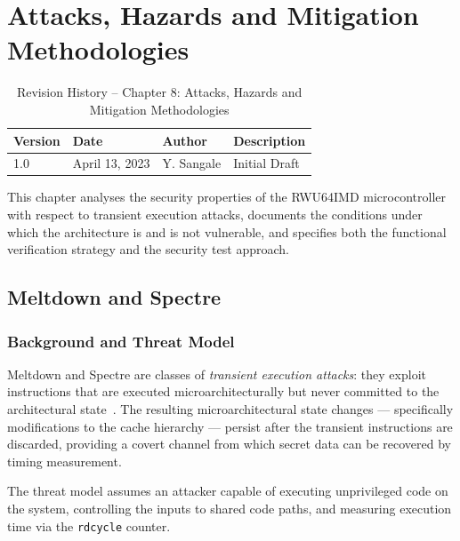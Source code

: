 \chapter{Attacks, Hazards and Mitigation Methodologies}
\label{chap:attacks}

\begin{table}[H]
  \caption{Revision History – Chapter 8: Attacks, Hazards and Mitigation Methodologies}
  \centering
  \begin{tabular}{llll}
    \toprule
    Version & Date           & Author     & Description   \\
    \midrule
    1.0     & April 13, 2023 & Y. Sangale & Initial Draft \\
    \bottomrule
  \end{tabular}
\end{table}

This chapter analyses the security properties of the RWU64IMD microcontroller
with respect to transient execution attacks, documents the conditions under
which the architecture is and is not vulnerable, and specifies both the
functional verification strategy and the security test approach.

\section{Meltdown and Spectre}
\label{sec:meltdown_spectre}

\subsection{Background and Threat Model}

Meltdown and Spectre are classes of \emph{transient execution attacks}: they
exploit instructions that are executed microarchitecturally but never committed
to the architectural state~\cite{lipp2018meltdown,kocher2019spectre}. The
resulting microarchitectural state changes — specifically modifications to the
cache hierarchy — persist after the transient instructions are discarded,
providing a covert channel from which secret data can be recovered by timing
measurement.

The threat model assumes an attacker capable of executing unprivileged code on
the system, controlling the inputs to shared code paths, and measuring
execution time via the \texttt{rdcycle} counter.

